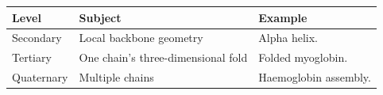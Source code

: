 \documentclass[12pt,a4paper]{article}
\begin{document}
\begin{tcolorbox}[tikzbox, title={Summary Comparison}]
\par\vspace{5pt}
\begingroup
\setlength{\extrarowheight}{1pt}
\noindent\begin{tabularx}{\linewidth}{|B{3.45cm}|Y|Y|}
\hline
\textbf{Level} & \textbf{Subject} & \textbf{Example} \\ \hline
Secondary & Local backbone geometry & Alpha helix. \\ \hline
Tertiary & One chain's three-dimensional fold & Folded myoglobin. \\ \hline
Quaternary & Multiple chains & Haemoglobin assembly. \\ \hline
\end{tabularx}\par
\endgroup
\end{tcolorbox}
\end{document}
